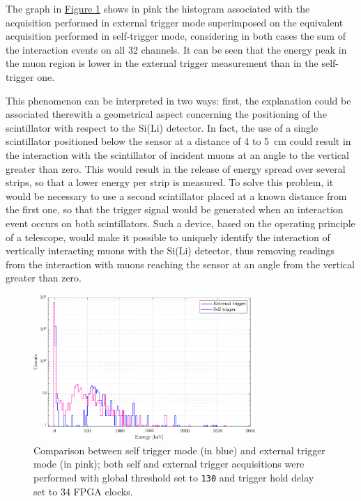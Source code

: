 \par
The graph in \hyperref[figMUONselfExtComparativa]{Figure \ref{figMUONselfExtComparativa}} shows in pink the histogram associated with the acquisition performed in external trigger mode superimposed on the equivalent acquisition performed in self-trigger mode, considering in both cases the sum of the interaction events on all 32 channels. It can be seen that the energy peak in the muon region is lower in the external trigger measurement than in the self-trigger one.

\par
This phenomenon can be interpreted in two ways: first, the explanation could be associated therewith a geometrical aspect concerning the positioning of the scintillator with respect to the Si(Li) detector. In fact, the use of a single scintillator positioned below the sensor at a distance of  4 to \SI{5}{\cm} could result in the interaction with the scintillator of incident muons at an angle to the vertical greater than zero. This would result in the release of energy spread over several strips, so that a lower energy per strip is measured. To solve this problem, it would be necessary to use a second scintillator placed at a known distance from the first one, so that the trigger signal would be generated when an interaction event occurs on both scintillators. Such a device, based on the operating principle of a telescope, would make it possible to uniquely identify the interaction of vertically interacting muons with the Si(Li) detector, thus removing readings from the interaction with muons reaching the sensor at an angle from the vertical greater than zero.

\begin{figure}[h!]
    \centering
    \includegraphics[width=0.75\textwidth]{Images/chap3/results/muons/incoming_energy_external34_self_100_keV.pdf} %
    \caption{Comparison between self trigger mode (in blue) and external trigger mode (in pink); both self and external trigger acquisitions were performed with global threshold set to \texttt{130} and trigger hold delay set to 34 FPGA clocks.}
    \label{figMUONselfExtComparativa}
\end{figure}

